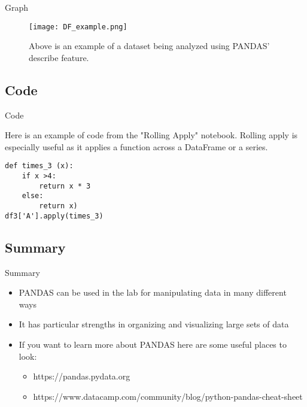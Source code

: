 \documentclass{beamer}
\begin{document}
\begin{frame}{Graph}

\begin{figure}
\texttt{[image: DF\_example.png]} 
\caption{\label{fig:your-figure} Above is an example of a dataset being analyzed using PANDAS' describe feature.}
\end{figure}

\end{frame}{}

\subsection{Code}

\begin{frame}[fragile]{Code}

Here is an example of code from the "Rolling Apply" notebook. Rolling apply is especially useful as it applies a function across a DataFrame or a series.  

\begin{verbatim}
def times_3 (x):
    if x >4:
        return x * 3
    else:
        return x)
df3['A'].apply(times_3)

\end{verbatim}

\end{frame}

\subsection{Summary}

\begin{frame}{Summary}

\begin{itemize}
\item PANDAS can be used in the lab for manipulating data in many different ways   
\item It has particular strengths in organizing and visualizing large sets of data 
\item If you want to learn more about PANDAS here are some useful places to look:
	\begin{itemize}
    \item https://pandas.pydata.org
    \item https://www.datacamp.com/community/blog/python-pandas-cheat-sheet
	\end{itemize}
\end{itemize}

\end{frame}
\end{document}
